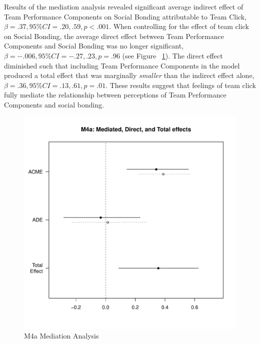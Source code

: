 \begin{CJK}{UTF8}{gbsn}
  Results of the mediation analysis revealed significant average indirect effect of Team Performance Components on Social Bonding attributable to Team Click, $\beta = .37, 95\% CI = .20 , .59, p < .001$.  When controlling for the effect of team click on Social Bonding, the average direct effect between Team Performance Components and Social Bonding was no longer significant, $\beta = -.006, 95\% CI = -.27 , .23, p = .96 $ (see Figure ~\ref{fig:MLM4aMediationAnalysis}). The direct effect diminished such that including Team Performance Components in the model produced a total effect that was marginally \textit{smaller} than the indirect effect alone, $\beta = .36, 95\% CI = .13 , .61, p = .01$. These results suggest that feelings of team click fully mediate the relationship between perceptions of Team Performance Components and social bonding.



  \begin{figure}[htbp]
    \centering
    \includegraphics[scale = .5]{images/MLM4aMediationEffects.pdf}
    \caption{M4a Mediation Analysis}
    \label{fig:MLM4aMediationAnalysis}
  \end{figure}


\end{CJK}
